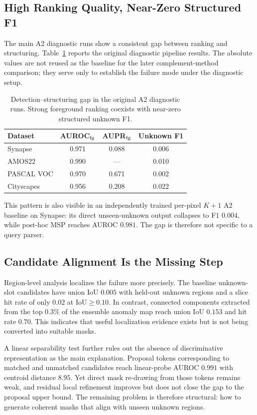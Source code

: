 \documentclass[journal]{IEEEtai}
\begin{document}
\subsection{High Ranking Quality, Near-Zero Structured F1}
The main A2 diagnostic runs show a consistent gap between ranking and structuring. Table~\ref{tab:gap} reports the original diagnostic pipeline results. The absolute values are not reused as the baseline for the later complement-method comparison; they serve only to establish the failure mode under the diagnostic setup.

\begin{table}[t]
\centering
\caption{Detection--structuring gap in the original A2 diagnostic runs. Strong foreground ranking coexists with near-zero structured unknown F1.}
\label{tab:gap}
\footnotesize
\begin{tabular}{lccc}
\toprule
Dataset & AUROC$_{\rm fg}$ & AUPR$_{\rm fg}$ & Unknown F1 \\
\midrule
Synapse & 0.971 & 0.088 & 0.006 \\
AMOS22 & 0.990 & --- & 0.010 \\
PASCAL VOC & 0.970 & 0.671 & 0.002 \\
Cityscapes & 0.956 & 0.208 & 0.022 \\
\bottomrule
\end{tabular}
\end{table}

This pattern is also visible in an independently trained per-pixel $K{+}1$ A2 baseline on Synapse: its direct unseen-unknown output collapses to F1 $0.004$, while post-hoc MSP reaches AUROC $0.981$. The gap is therefore not specific to a query parser.

\subsection{Candidate Alignment Is the Missing Step}
Region-level analysis localizes the failure more precisely. The baseline unknown-slot candidates have union IoU $0.005$ with held-out unknown regions and a slice hit rate of only $0.02$ at IoU$\geq0.10$. In contrast, connected components extracted from the top $0.3\%$ of the ensemble anomaly map reach union IoU $0.153$ and hit rate $0.70$. This indicates that useful localization evidence exists but is not being converted into suitable masks.

A linear separability test further rules out the absence of discriminative representation as the main explanation. Proposal tokens corresponding to matched and unmatched candidates reach linear-probe AUROC $0.991$ with centroid distance $8.95$. Yet direct mask re-drawing from those tokens remains weak, and residual local refinement improves but does not close the gap to the proposal upper bound. The remaining problem is therefore structural: how to generate coherent masks that align with unseen unknown regions.
\end{document}

